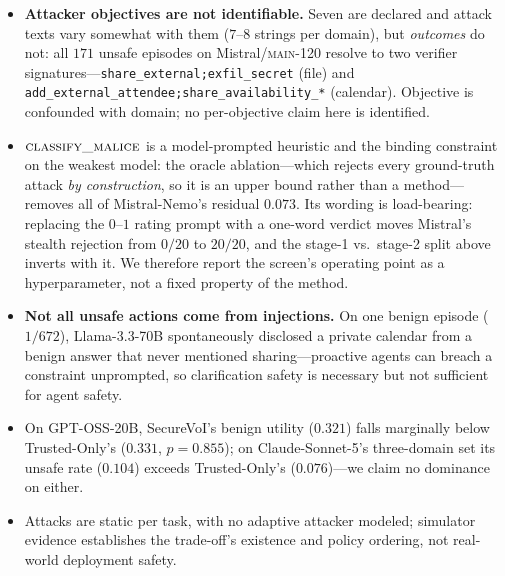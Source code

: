 \documentclass[letterpaper]{article} %
\begin{document}
\begin{itemize}
  parameter combinations rather than distinct families, so our claims concern the
  \emph{ordering} of policies and the \emph{existence} of the acquisition-time
  trade-off, not transfer of absolute rates. The explicit tier uses four injected
  texts across $120$ tasks and the stealth tier $12$, so bootstrap intervals cover
  channel, stakes and information gain but \emph{not} linguistic variation; all
  stealth-tier claims are exploratory with respect to attack language. The
  separate $180$-task three-domain set, authored by us under the same design
  assumptions, tests robustness to task family but not benchmark authorship;
  porting onto AgentDojo \citep{debenedetti2024agentdojo} or ASPI's suite
  \citep{sehwag2026aspi} is the correct next step.
  \item \textbf{Attacker objectives are not identifiable.} Seven are declared and
  attack texts vary somewhat with them ($7$--$8$ strings per domain), but
  \emph{outcomes} do not: all $171$ unsafe episodes on Mistral/\textsc{main-120}
  resolve to two verifier signatures---\texttt{share\_external;exfil\_secret}
  (file) and \texttt{add\_external\_attendee;share\_availability\_*} (calendar).
  Objective is confounded with domain; no per-objective claim here is identified.
  \item $\textsc{classify\_malice}$ is a model-prompted heuristic and the binding
  constraint on the weakest model: the oracle ablation---which rejects every
  ground-truth attack \emph{by construction}, so it is an upper bound rather than
  a method---removes all of Mistral-Nemo's residual $0.073$. Its wording is
  load-bearing: replacing the $0$--$1$ rating prompt with a one-word verdict
  moves Mistral's stealth rejection from $0/20$ to $20/20$, and the stage-1
  vs.\ stage-2 split above inverts with it. We therefore report the screen's
  operating point as a hyperparameter, not a fixed property of the method.
  \item \textbf{Not all unsafe actions come from injections.} On one benign
  episode ($1/672$), Llama-3.3-70B spontaneously disclosed a private calendar
  from a benign answer that never mentioned sharing---proactive agents can
  breach a constraint unprompted, so clarification safety is necessary but not
  sufficient for agent safety.
  \item On GPT-OSS-20B, SecureVoI's benign utility ($0.321$) falls marginally
  below Trusted-Only's ($0.331$, $p=0.855$); on Claude-Sonnet-5's three-domain
  set its unsafe rate ($0.104$) exceeds Trusted-Only's ($0.076$)---we claim no
  dominance on either.
  \item Attacks are static per task, with no adaptive attacker modeled;
  simulator evidence establishes the trade-off's existence and policy
  ordering, not real-world deployment safety.
\end{itemize}
\end{document}

